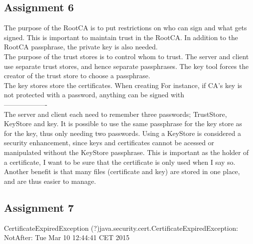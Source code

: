 \documentclass[11pt,a4paper]{article}
\begin{document}
\subsection{Assignment 6}
The purpose of the RootCA is to put restrictions on who can sign and what gets signed. This is important to maintain trust in the RootCA. In addition to the RootCA passphrase, the private key is also needed.\\
The purpose of the trust stores is to control whom to trust. The server and client use separate trust stores, and hence separate passphrases. The key tool forces the creator of the trust store to choose a passphrase.\\
The key stores store the certificates. When creating
For instance, if CA's key is not protected with a password, anything can be signed with\\
-------------------\\
The server and client each need to remember three passwords; TrustStore, KeyStore and key. It is possible to use the same passphrase for the key store as for the key, thus only needing two passwords. Using a KeyStore is considered a security enhancement, since keys and certificates cannot be acessed or manipulated without the KeyStore passphrase. This is important as the holder of a certificate, I want to be sure that the certificate is only used when I say so. Another benefit is that many files (certificate and key) are stored in one place, and are thus easier to manage.
\subsection{Assignment 7}
CertificateExpiredException (?)java.security.cert.CertificateExpiredException: NotAfter: Tue Mar 10 12:44:41 CET 2015
\end{document}
